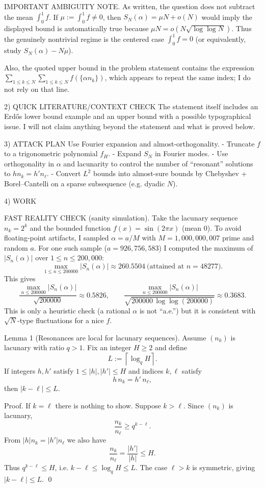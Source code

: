 IMPORTANT AMBIGUITY NOTE.
As written, the question does not subtract the mean $\int_0^1 f$.  If $\mu:=\int_0^1 f\neq 0$, then $S_N(\alpha)=\mu N+o(N)$ would imply the displayed bound is automatically true because $\mu N = o(N\sqrt{\log\log N})$.  Thus the genuinely nontrivial regime is the centered case $\int_0^1 f=0$ (or equivalently, study $S_N(\alpha)-N\mu$).

Also, the quoted upper bound in the problem statement contains the expression $\sum_{1\le k\le N}\sum_{1\le k\le N}f(\{\alpha n_k\})$, which appears to repeat the same index; I do not rely on that line.

2) QUICK LITERATURE/CONTEXT CHECK
The statement itself includes an Erd\H{o}s lower bound example and an upper bound with a possible typographical issue.  I will not claim anything beyond the statement and what is proved below.

3) ATTACK PLAN
Use Fourier expansion and almost-orthogonality.
- Truncate $f$ to a trigonometric polynomial $f_H$.
- Expand $S_N$ in Fourier modes.
- Use orthogonality in $\alpha$ and lacunarity to control the number of ``resonant'' solutions to $h n_k = h' n_\ell$.
- Convert $L^2$ bounds into almost-sure bounds by Chebyshev + Borel--Cantelli on a sparse subsequence (e.g. dyadic $N$).

4) WORK

FAST REALITY CHECK (sanity simulation).
Take the lacunary sequence $n_k=2^k$ and the bounded function $f(x)=\sin(2\pi x)$ (mean $0$).  To avoid floating-point artifacts, I sampled $\alpha=a/M$ with $M=1{,}000{,}000{,}007$ prime and random $a$.
For one such sample ($a=926{,}756{,}583$) I computed the maximum of $|S_n(\alpha)|$ over $1\le n\le 200{,}000$:
\[
\max_{1\le n\le 200000}|S_n(\alpha)|\approx 260.5504\ \text{(attained at }n=48277\text{)}.
\]
This gives
\[
\frac{\max_{n\le 200000}|S_n(\alpha)|}{\sqrt{200000}}\approx 0.5826,
\qquad
\frac{\max_{n\le 200000}|S_n(\alpha)|}{\sqrt{200000\,\log\log(200000)}}\approx 0.3683.
\]
This is only a heuristic check (a rational $\alpha$ is not ``a.e.'') but it is consistent with $\sqrt{N}$-type fluctuations for a nice $f$.

Lemma 1 (Resonances are local for lacunary sequences).
Assume $(n_k)$ is lacunary with ratio $q>1$.  Fix an integer $H\ge 2$ and define
\[
L:=\left\lceil \log_q H\right\rceil.
\]
If integers $h,h'$ satisfy $1\le |h|,|h'|\le H$ and indices $k,\ell$ satisfy
\[
 h\,n_k = h'\,n_\ell,
\]
then $|k-\ell|\le L$.

Proof.
If $k=\ell$ there is nothing to show.  Suppose $k>\ell$.  Since $(n_k)$ is lacunary,
\[
\frac{n_k}{n_\ell} \ge q^{k-\ell}.
\]
From $|h|n_k=|h'|n_\ell$ we also have
\[
\frac{n_k}{n_\ell} = \frac{|h'|}{|h|} \le H.
\]
Thus $q^{k-\ell}\le H$, i.e. $k-\ell\le \log_q H\le L$.  The case $\ell>k$ is symmetric, giving $|k-\ell|\le L$. \qed

